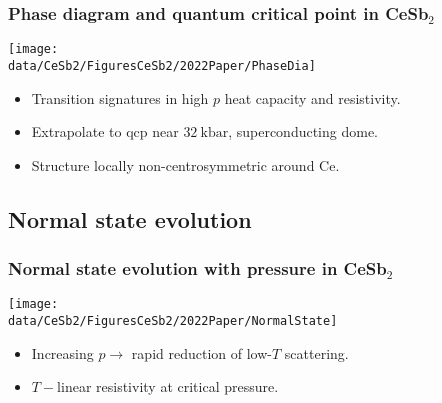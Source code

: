 \begin{frame}[label=PhaseDia]
\frametitle{Phase diagram and quantum critical point in CeSb$_2$}

\centerline{\texttt{[image: \\data/CeSb2/FiguresCeSb2/2022Paper/PhaseDia]}}

\begin{itemize}
\item Transition signatures in high $p$ heat capacity and resistivity.
\item Extrapolate to qcp near $\SI{32}{\kilo\bar}$, superconducting dome.
\item Structure locally non-centrosymmetric around Ce.

\end{itemize}
\end{frame}


\subsection{Normal state evolution}

\begin{frame}[label=NormalState]
\frametitle{Normal state evolution with pressure in CeSb$_2$}

\centerline{\texttt{[image: \\data/CeSb2/FiguresCeSb2/2022Paper/NormalState]}}

\begin{itemize}
\item Increasing $p \rightarrow$ rapid reduction of low-$T$ scattering. %
\item $T-$linear resistivity at critical pressure.

\end{itemize}


\end{frame}




